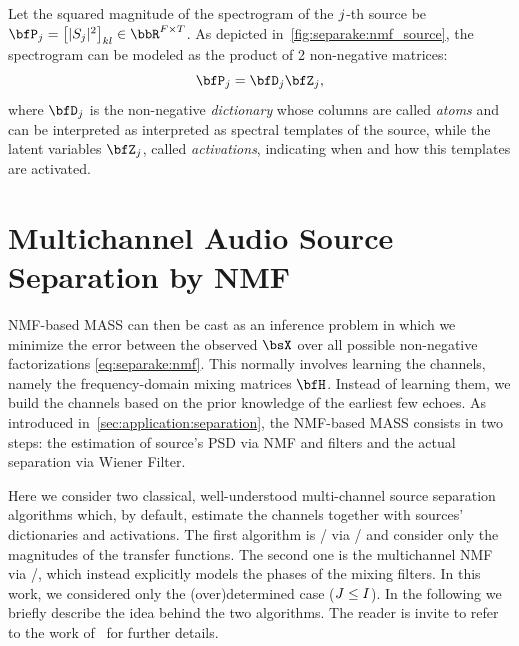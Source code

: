 \mynewline
Let the squared magnitude of the spectrogram of the $j$-th source be $\mP_\idxSrc = \klist{\powerOf{\SRC_\idxSrc}}_{kl} \in \bbR^{F\times T}$.
As depicted in~\cref{fig:separake:nmf_source}, the spectrogram can be modeled as the product of 2 non-negative matrices:
\begin{equation}
    \label{eq:separake:nmf}
    \mP_\idxSrc =  \mD_\idxSrc \mZ_\idxSrc,
\end{equation}
where $\mD_\idxSrc$ is the non-negative \textit{dictionary} whose columns are called \textit{atoms} and can be interpreted as interpreted as spectral templates of the source,
while the latent variables $\mZ_\idxSrc$, called \textit{activations}, indicating when and how this templates are activated.


\section{Multichannel Audio Source Separation by NMF}
\ac{NMF}-based \acf{MASS} can then be cast as an inference problem in which we minimize the error between the observed $\MICS$ over all possible non-negative factorizations \eqref{eq:separake:nmf}.
This normally involves learning the channels, namely the frequency-domain mixing matrices $\FLTSS$.
Instead of learning them, we build the channels based on the prior knowledge of the earliest few echoes.
As introduced in~\cref{sec:application:separation}, the \ac{NMF}-based \ac{MASS} consists in two steps:
the estimation of source's \acf{PSD} via \ac{NMF} and filters and the actual separation via Wiener Filter.

\mynewline
Here we consider two classical, well-understood multi-channel source separation algorithms which, by default, estimate the channels together with sources' dictionaries and activations.
The first algorithm is \NMFdef/ via \MUdef/ and consider only the magnitudes of the transfer functions.
The second one is the multichannel \ac{NMF} via \EMdef/, which instead explicitly models the phases of the mixing filters.
In this work, we considered only the (over)determined case ($J \leq I$).
In the following we briefly describe the idea behind the two algorithms.
The reader is invite to refer to the work of~ for further details.

